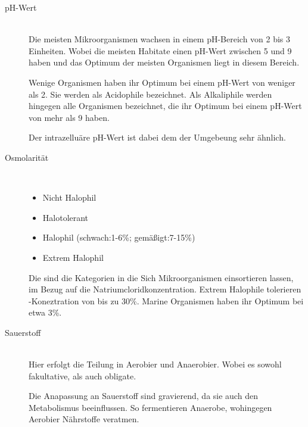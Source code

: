\begin{description}
	\item[pH-Wert]			\hfill	\\
		Die meisten Mikroorganismen wachsen in einem pH-Bereich von 2 bis 3 Einheiten.
		Wobei die meisten Habitate einen pH-Wert zwischen 5 und 9 haben
		und das Optimum der meisten Organismen liegt in diesem Bereich.

		Wenige Organismen haben ihr Optimum bei einem pH-Wert von weniger als 2.
		Sie werden als Acidophile bezeichnet.
		Als Alkaliphile werden hingegen alle Organismen bezeichnet,
		die ihr Optimum bei einem pH-Wert von mehr als 9 haben.

		Der intrazelluäre pH-Wert ist dabei dem der Umgebeung sehr ähnlich.
	
	\item[Osmolarität]	\hfill	\\
		\begin{itemize}
			\item Nicht Halophil
			\item Halotolerant
			\item Halophil	(schwach:1-6\%; gemäßigt:7-15\%)
			\item Extrem Halophil 
		\end{itemize}

		Die sind die Kategorien in die Sich Mikroorganismen einsortieren lassen,
		im Bezug auf die Natriumcloridkonzentration.
		Extrem Halophile tolerieren -Koneztration von bis zu 30\%.
		Marine Organismen haben ihr Optimum bei etwa 3\%.
	
	\item[Sauerstoff]		\hfill	\\
		Hier erfolgt die Teilung in Aerobier und Anaerobier.
		Wobei es sowohl fakultative,
		als auch obligate.

		Die Anapassung an Sauerstoff sind gravierend,
		da sie auch den Metabolismus beeinflussen.
		So fermentieren Anaerobe,
		wohingegen Aerobier Nährstoffe veratmen.


\end{description}
